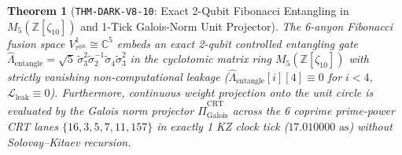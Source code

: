 \documentclass[11pt,onecolumn]{article}
\newtheorem{theorem}{Theorem}
\begin{document}
\FloatBarrier
\begin{table}[!htbp]
\centering\small
\caption{Cyclotomic Projection Profile and Multi-Qubit Entangling Performance (\texttt{THM-DARK-V8-10}).}
\label{tab:v8_100_cyclotomic_profile}
\end{table}
\FloatBarrier

\begin{theorem}[{\texttt{THM-DARK-V8-10}: Exact 2-Qubit Fibonacci Entangling in $M_5(\mathbb{Z}[\zeta_{10}])$ and 1-Tick Galois-Norm Unit Projector}]
\label{thm:dark_v8_10}
The 6-anyon Fibonacci fusion space $V_{\tau^{\otimes 6}}^1 \cong \mathbb{C}^5$ embeds an exact 2-qubit controlled entangling gate $\hat{\Lambda}_{\text{entangle}} = \sqrt{5}\,\tilde{\sigma}_3^2 \tilde{\sigma}_2^{-1} \tilde{\sigma}_4 \tilde{\sigma}_3^2$ in the cyclotomic matrix ring $M_5(\mathbb{Z}[\zeta_{10}])$ with strictly vanishing non-computational leakage ($\hat{\Lambda}_{\text{entangle}}[i][4] \equiv 0$ for $i < 4$, $\mathcal{L}_{\text{leak}} \equiv 0$). Furthermore, continuous weight projection onto the unit circle is evaluated by the Galois norm projector $\hat{\Pi}_{\text{Galois}}^{\text{CRT}}$ across the 6 coprime prime-power CRT lanes $\{16, 3, 5, 7, 11, 157\}$ in exactly 1 KZ clock tick ($17.010000\text{ as}$) without Solovay--Kitaev recursion.
\end{theorem}
\end{document}
